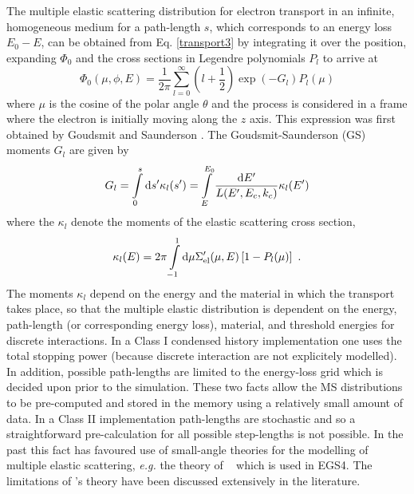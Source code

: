 The multiple elastic scattering distribution for electron
transport in an infinite, homogeneous medium for a path-length
$s$, which corresponds to an energy loss $E_0 - E$, can be obtained
from Eq. \eqref{transport3} by integrating it over the position,
expanding $\Phi_0$ and the cross sections in Legendre polynomials
$P_l$ to arrive at
\begin{equation}
\Phi_0(\mu,\phi,E) = \frac{1}{2 \pi} \sum_{l=0}^\infty \left(l + \frac{1}{2}
\right) \exp( -G_l ) P_l(\mu)
\end{equation}
where $\mu$ is the cosine of the polar angle $\theta$ and the process
is considered in a frame where the electron is initially moving
along the $z$ axis. This expression was first obtained by
Goudsmit and Saunderson \cite{GS40,GS40a}. The Goudsmit-Saunderson
(GS) moments $G_l$ are given by
\begin{equation}
\label{GS_moments}
G_l = \int\limits_0^s {\rm d}s' \kappa_l(s') =  \int\limits_{E}^{E_0}
{{\rm d}E' \over L(E',E_c,k_c)} \kappa_l(E')
\end{equation}
where the $\kappa_l$ denote the moments of the elastic scattering
cross section,
\begin{equation}
\label{kappa_l}
\kappa_l(E) = 2 \pi
\int\limits_{-1}^1 {\rm d}\mu
\Sigma_{\rm el}'(\mu,E) \left[ 1 - P_l(\mu) \right] ~.
\end{equation}
The moments $\kappa_l$ depend on the energy and the material in
which the transport takes place, so that the
multiple elastic distribution is dependent on the energy,
path-length (or corresponding energy loss), material, and
threshold energies for discrete interactions. In a Class I
condensed history implementation one uses the total stopping
power (because discrete interaction are not explicitely modelled).
In addition, possible path-lengths are limited to the
energy-loss grid which is decided upon prior to the simulation.
These two facts allow the MS distributions to be pre-computed
and stored in the memory using a relatively small amount of
data. In a Class II implementation path-lengths are stochastic
and so a straightforward pre-calculation for all possible step-lengths
is not possible. In the past this fact has favoured use of
small-angle theories for the modelling of multiple elastic
scattering, {\em e.g.} the theory of \Mol~ which is used in EGS4.
The limitations of \Mol's theory have been discussed extensively
in the literature.

